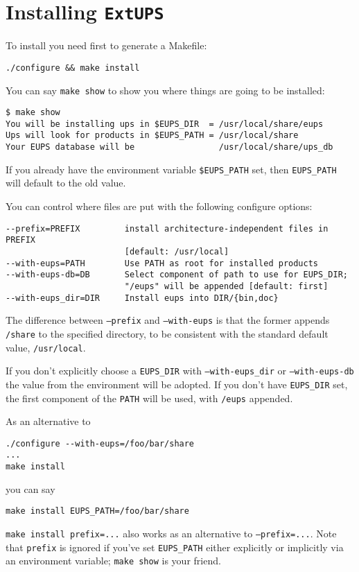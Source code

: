 \documentclass{article}
\newcommand{\code}[1]{\texttt{#1}}
\newcommand{\eups}{\code{ExtUPS}}
\begin{document}
\section{Installing \eups{}}
  
  To install you need first to generate a Makefile:
\begin{verbatim}
./configure && make install
\end{verbatim}

You can say \code{make show} to show you where things are
going to be installed:
\begin{verbatim}
$ make show
You will be installing ups in $EUPS_DIR  = /usr/local/share/eups
Ups will look for products in $EUPS_PATH = /usr/local/share
Your EUPS database will be                 /usr/local/share/ups_db
\end{verbatim} %
If you already have the environment variable \code{\$EUPS\_PATH} set,
then \code{EUPS\_PATH} will default to the old value.

You can control where files are put with the following configure options:
\begin{verbatim}
--prefix=PREFIX         install architecture-independent files in PREFIX
                        [default: /usr/local]
--with-eups=PATH        Use PATH as root for installed products
--with-eups-db=DB       Select component of path to use for EUPS_DIR;
                        "/eups" will be appended [default: first]
--with-eups_dir=DIR     Install eups into DIR/{bin,doc}
\end{verbatim}
The difference between \code{--prefix} and \code{--with-eups}
is that the former appends \code{/share} to the specified directory, to
be consistent with the standard default value, \code{/usr/local}.

If you don't explicitly choose a \code{EUPS\_DIR} with
\code{--with-eups\_dir} or \code{--with-eups-db} the value from the
environment will be adopted. If you don't have \code{EUPS\_DIR} set,
the first component of the \code{PATH} will be used, with \code{/eups}
appended.
  
As an alternative to
\begin{verbatim}
./configure --with-eups=/foo/bar/share
...
make install
\end{verbatim}
you can say
\begin{verbatim}
make install EUPS_PATH=/foo/bar/share
\end{verbatim}
\code{make install prefix=...} also works as an alternative to \code{--prefix=...}.
Note that \code{prefix} is ignored if you've set \code{EUPS\_PATH} either explicitly
or implicitly via an environment variable; \code{make show} is your friend.
\end{document}
